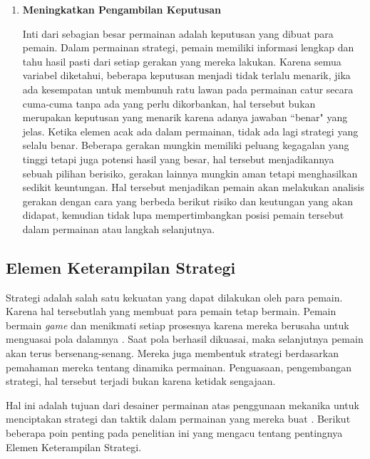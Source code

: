\begin{enumerate}[label=\textbf{\alph*).}]
	\item \textbf{Meningkatkan Pengambilan Keputusan}

	Inti dari sebagian besar permainan adalah keputusan yang dibuat para pemain. Dalam permainan strategi, pemain memiliki informasi lengkap dan tahu hasil pasti dari setiap gerakan yang mereka lakukan. Karena semua variabel diketahui, beberapa keputusan menjadi tidak terlalu menarik, jika ada kesempatan untuk membunuh ratu lawan pada permainan catur secara cuma-cuma tanpa ada yang perlu dikorbankan, hal tersebut bukan merupakan keputusan yang menarik karena adanya jawaban ``benar" yang jelas. Ketika elemen acak ada dalam permainan, tidak ada lagi strategi yang selalu benar. Beberapa gerakan mungkin memiliki peluang kegagalan yang tinggi tetapi juga potensi hasil yang besar, hal tersebut menjadikannya sebuah pilihan berisiko, gerakan lainnya mungkin aman tetapi menghasilkan sedikit keuntungan. Hal tersebut menjadikan pemain akan melakukan analisis gerakan dengan cara yang berbeda berikut risiko dan keutungan yang akan didapat, kemudian tidak lupa mempertimbangkan posisi pemain tersebut dalam permainan atau langkah selanjutnya.
	\vspace{1ex}
	
\end{enumerate}

\subsection{Elemen Keterampilan Strategi}
\label{sec:sub_sec2_strategi}
\vspace{1ex}

Strategi adalah salah satu kekuatan yang dapat dilakukan oleh para pemain. Karena hal tersebutlah yang membuat para pemain tetap bermain. Pemain bermain \textit{game} dan menikmati setiap prosesnya karena mereka berusaha untuk menguasai pola dalamnya \citep{Koster2013}. Saat pola berhasil dikuasai, maka selanjutnya pemain akan terus bersenang-senang. Mereka juga membentuk strategi berdasarkan pemahaman mereka tentang dinamika permainan. Penguasaan, pengembangan strategi, hal tersebut terjadi bukan karena ketidak sengajaan. 
\vspace{1ex}

Hal ini adalah tujuan dari desainer permainan atas penggunaan mekanika untuk menciptakan strategi dan taktik dalam permainan yang mereka buat \cite{Brathwaite2009}. Berikut beberapa poin penting pada penelitian ini yang mengacu tentang pentingnya Elemen Keterampilan Strategi.
\vspace{1ex}

